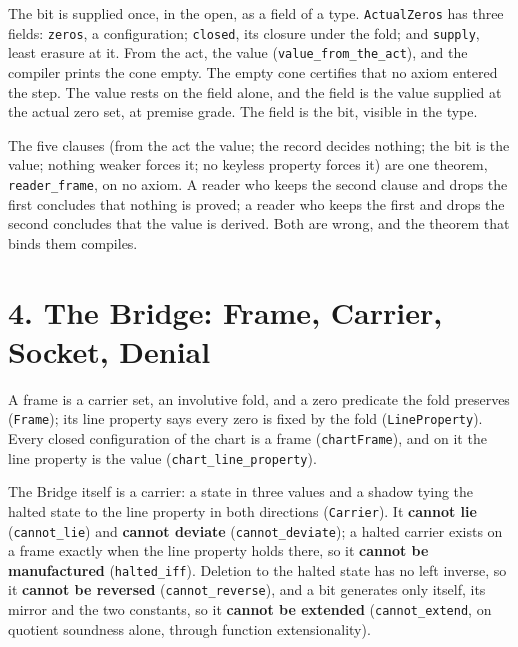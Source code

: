 \documentclass[10pt,twocolumn]{article}
\begin{document}
The bit is supplied once, in the open, as a field of a type.
\texttt{ActualZeros} has three fields: \texttt{zeros}, a configuration;
\texttt{closed}, its closure under the fold; and \texttt{supply}, least
erasure at it. From the act, the value (\texttt{value\_\allowbreak{}from\_\allowbreak{}the\_\allowbreak{}act}),
and the compiler prints the cone empty. The empty cone certifies that no
axiom entered the step. The value rests on the field alone, and the
field is the value supplied at the actual zero set, at premise grade.
The field is the bit, visible in the type.

The five clauses (from the act the value; the record decides nothing;
the bit is the value; nothing weaker forces it; no keyless property
forces it) are one theorem, \texttt{reader\_\allowbreak{}frame}, on no axiom. A
reader who keeps the second clause and drops the first concludes that
nothing is proved; a reader who keeps the first and drops the second
concludes that the value is derived. Both are wrong, and the theorem
that binds them compiles.

\hypertarget{the-bridge-frame-carrier-socket-denial}{%
\section{4. The Bridge: Frame, Carrier, Socket,
Denial}\label{the-bridge-frame-carrier-socket-denial}}

A frame is a carrier set, an involutive fold, and a zero predicate the
fold preserves (\texttt{Frame}); its line property says every zero is
fixed by the fold (\texttt{LineProperty}). Every closed configuration of
the chart is a frame (\texttt{chartFrame}), and on it the line property
is the value (\texttt{chart\_\allowbreak{}line\_\allowbreak{}property}).

The Bridge itself is a carrier: a state in three values and a shadow
tying the halted state to the line property in both directions
(\texttt{Carrier}). It \textbf{cannot lie} (\texttt{cannot\_\allowbreak{}lie}) and
\textbf{cannot deviate} (\texttt{cannot\_\allowbreak{}deviate}); a halted carrier
exists on a frame exactly when the line property holds there, so it
\textbf{cannot be manufactured} (\texttt{halted\_\allowbreak{}iff}). Deletion to the
halted state has no left inverse, so it \textbf{cannot be reversed}
(\texttt{cannot\_\allowbreak{}reverse}), and a bit generates only itself, its mirror
and the two constants, so it \textbf{cannot be extended}
(\texttt{cannot\_\allowbreak{}extend}, on quotient soundness alone, through function
extensionality).
\end{document}
